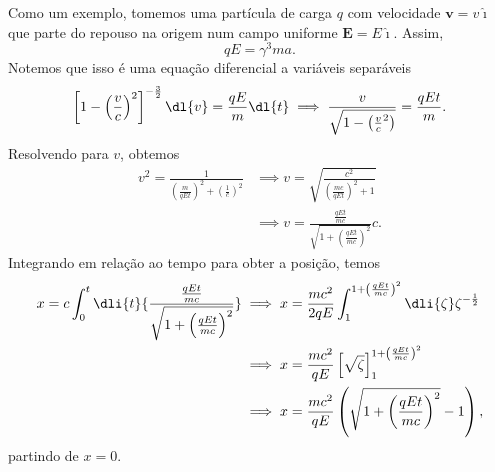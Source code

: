 Como um exemplo, tomemos uma partícula de carga \(q\) com velocidade \(\boldsymbol{v} = v\boldsymbol{\hat{\imath}}\) que parte do repouso na origem num campo uniforme \(\boldsymbol{E} = E\boldsymbol{\hat{\imath}}\). Assim,
\begin{equation*}
    qE = \gamma^3 ma.
\end{equation*}
Notemos que isso é uma equação diferencial a variáveis separáveis
\begin{equation*}
    \left[1 - \left(\frac{v}{c}\right)^2\right]^{-\frac32}\dl{v} = \frac{qE}{m} \dl{t} \implies \frac{v}{\sqrt{1 - \left(\frac{v}{c}^2\right)}} = \frac{qEt}{m}.
\end{equation*}
Resolvendo para \(v\), obtemos
\begin{align*}
    v^2 = \frac{1}{\left(\frac{m}{qEt}\right)^2 + \left(\frac{1}{c}\right)^2} &\implies v = \sqrt{\frac{c^2}{\left(\frac{mc}{qEt}\right)^2 + 1}}\\
                                                                              &\implies v = \frac{\frac{qEt}{mc}}{\sqrt{1 + \left(\frac{qEt}{mc}\right)^2}}c.
\end{align*}
Integrando em relação ao tempo para obter a posição, temos
\begin{align*}
    x = c\int_{0}^{t}\dli{t}{\frac{\frac{qEt}{mc}}{\sqrt{1 + \left(\frac{qEt}{mc}\right)^2}}} &\implies x = \frac{mc^2}{2qE} \int_{1}^{1+\left(\frac{qEt}{mc}\right)^2} \dli{\zeta} \zeta^{-\frac12}\\
                                                                                              &\implies x = \frac{mc^2}{qE} \left[\sqrt\zeta\right]_{1}^{1+\left(\frac{qEt}{mc}\right)^2}\\
                                                                                              &\implies x = \frac{mc^2}{qE}\left(\sqrt{1 + \left(\frac{qEt}{mc}\right)^2} - 1\right),
\end{align*}
partindo de \(x = 0\).

